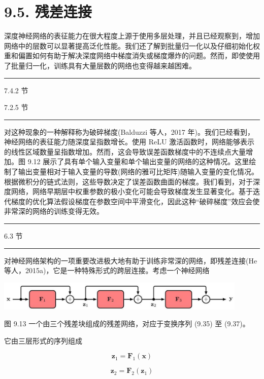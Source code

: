 \documentclass[10pt]{article}
\newcommand{\HRule}{\begin{center}\rule{0.9\linewidth}{0.2mm}\end{center}}
\begin{document}
\section*{9.5. 残差连接}

深度神经网络的表征能力在很大程度上源于使用多层处理，并且已经观察到，增加网络中的层数可以显著提高泛化性能。我们还了解到批量归一化以及仔细初始化权重和偏置如何有助于解决深度网络中梯度消失或梯度爆炸的问题。然而，即使使用了批量归一化，训练具有大量层数的网络也变得越来越困难。

\HRule

7.4.2 节

7.2.5 节

\HRule

对这种现象的一种解释称为破碎梯度(Balduzzi 等人，2017 年)。我们已经看到，神经网络的表征能力随深度呈指数增长。使用 ReLU 激活函数时，网络能够表示的线性区域数量呈指数增加。然而，这会导致误差函数梯度中的不连续点大量增加。图 9.12 展示了具有单个输入变量和单个输出变量的网络的这种情况。这里绘制了输出变量相对于输入变量的导数(网络的雅可比矩阵)随输入变量的变化情况。根据微积分的链式法则，这些导数决定了误差函数曲面的梯度。我们看到，对于深度网络，网络早期层中权重参数的极小变化可能会导致梯度发生显著变化。基于迭代梯度的优化算法假设梯度在参数空间中平滑变化，因此这种“破碎梯度”效应会使非常深的网络的训练变得无效。

\HRule

6.3 节

\HRule

对神经网络架构的一项重要改进极大地有助于训练非常深的网络，即残差连接(He 等人，2015a)，它是一种特殊形式的跨层连接。考虑一个神经网络

\begin{center}
\includegraphics[max width=0.9\textwidth]{images/0194e279-9b28-703a-88f4-c3ac21e2010d_294_340_342_1114_130_0.jpg}
\end{center}
\hspace*{3em} 

图 9.13 一个由三个残差块组成的残差网络，对应于变换序列 (9.35) 至 (9.37)。

它由三层形式的序列组成

\[
{\mathbf{z}}_{1} = {\mathbf{F}}_{1}\left( \mathbf{x}\right)  \tag{9.32}
\]

\[
{\mathbf{z}}_{2} = {\mathbf{F}}_{2}\left( {\mathbf{z}}_{1}\right)  \tag{9.33}
\]
\end{document}
